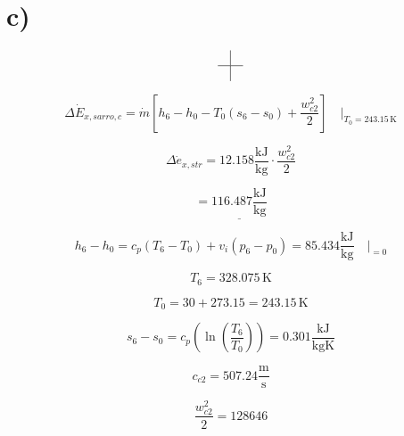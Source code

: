 

\section*{c)}

\[
\begin{array}{c}
\begin{array}{c|c}
 & \\
\hline
 & 
\end{array}
\end{array}
\]

\[
\Delta \dot{E}_{x,sarro,c} = \dot{m} \left[ h_6 - h_0 - T_0 (s_6 - s_0) + \frac{w_{c2}^2}{2} \right] \quad \Bigg|_{T_0 = 243.15 \, \text{K}}
\]

\[
\Delta \dot{e}_{x,str} = 12.158 \frac{\text{kJ}}{\text{kg}} \cdot \frac{w_{c2}^2}{2}
\]

\[
= \underline{116.487 \frac{\text{kJ}}{\text{kg}}}
\]

\[
h_6 - h_0 = c_p \left( T_6 - T_0 \right) + v_i (p_6 - p_0) = 85.434 \frac{\text{kJ}}{\text{kg}} \quad \Bigg|_{=0}
\]

\[
T_6 = 328.075 \, \text{K}
\]

\[
T_0 = 30 + 273.15 = 243.15 \, \text{K}
\]

\[
s_6 - s_0 = c_p \left( \ln \left( \frac{T_6}{T_0} \right) \right) = 0.301 \frac{\text{kJ}}{\text{kgK}}
\]

\[
c_{c2} = 507.24 \frac{\text{m}}{\text{s}}
\]

\[
\frac{w_{c2}^2}{2} = 128646
\]